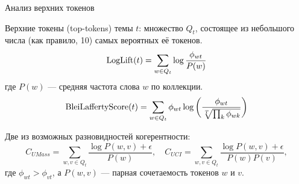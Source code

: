 \begin{frame}[t]{Анализ верхних токенов}

Верхние токены (top-tokens) темы $t$: множество $Q_t$, состоящее из небольшого числа (как правило, 10) самых вероятных её токенов.\\

\[
\textup{LogLift}(t) = \sum_{w\in Q_t} \log \frac{\phi_{wt}}{P(w)}
\]
где $P(w)$ ---  средняя частота слова $w$ по коллекции.
\[
\textup{BleiLaffertyScore}(t) = \sum_{w\in Q_t} \phi_{wt} \log \bigg( \frac{\phi_{wt}}{\sqrt[T]{\prod_k \phi_{wk}}}\bigg)
\]

Две из возможных разновидностей когерентности:\\
\[
C_{UMass} = \sum_{w,v \in Q_t} \frac{\log P(w, v) + \epsilon}{P(w)}, \quad
C_{UCI} = \sum_{w,v \in Q_t} \frac{\log P(w, v) + \epsilon}{P(w)P(v)},
\]
где $\phi_{wt} > \phi_{vt}$, а $P(w, v)$ --- парная сочетаемость токенов $w$ и $v$.

\end{frame}


